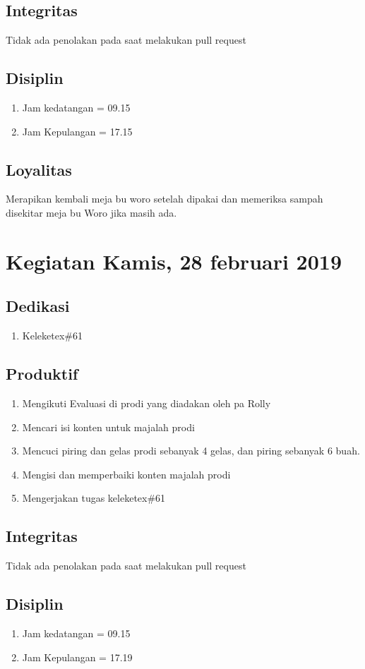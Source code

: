 \subsection{Integritas}
Tidak ada penolakan pada saat melakukan pull request
\subsection{Disiplin}
\begin{enumerate}
\item Jam kedatangan = 09.15
\item Jam Kepulangan = 17.15
\end{enumerate}
\subsection{Loyalitas}
Merapikan kembali meja bu woro setelah dipakai dan memeriksa sampah disekitar meja bu Woro jika masih ada.

\section{Kegiatan Kamis, 28 februari 2019}
\subsection{Dedikasi}
\begin{enumerate}
\item Keleketex\#61
\end{enumerate}
\subsection{Produktif}
\begin{enumerate}
\item Mengikuti Evaluasi di prodi yang diadakan oleh pa Rolly
\item Mencari isi konten untuk majalah prodi
\item Mencuci piring dan gelas prodi sebanyak 4 gelas, dan piring sebanyak 6 buah. 
\item Mengisi dan memperbaiki konten majalah prodi
\item Mengerjakan tugas keleketex\#61
\end {enumerate}
\subsection{Integritas}
Tidak ada penolakan pada saat melakukan pull request
\subsection{Disiplin}
\begin{enumerate}
\item Jam kedatangan = 09.15
\item Jam Kepulangan = 17.19
\end{enumerate}
